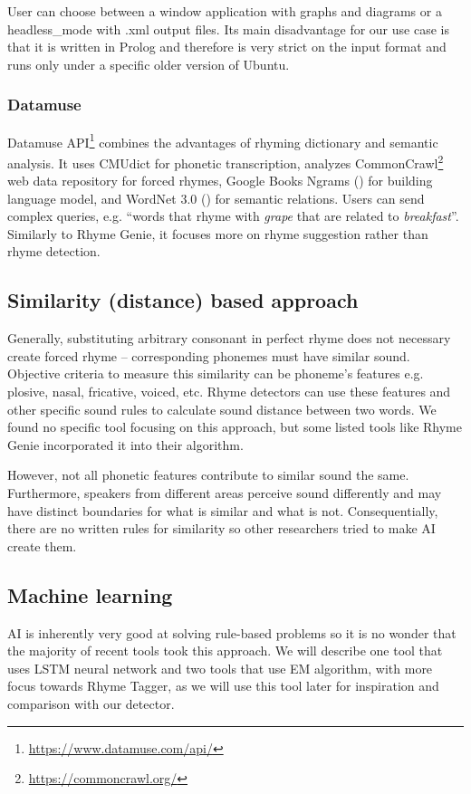User can choose between a window application with graphs and diagrams or a \gls{headless_mode} with .xml output files. Its main disadvantage for our use case is that it is written in Prolog and therefore is very strict on the input format and runs only under a specific older version of Ubuntu. 

\subsubsection*{Datamuse}
Datamuse API\footnote{\url{https://www.datamuse.com/api/}} combines the advantages of rhyming dictionary and semantic analysis. It uses CMUdict for phonetic transcription, analyzes CommonCrawl\footnote{\url{https://commoncrawl.org/}} web data repository for forced rhymes, Google Books Ngrams (\cite{weiss2015google}) for building language model, and WordNet 3.0 (\cite{pearson2005encyclopedia}) for semantic relations. Users can send complex queries, e.g. ``words that rhyme with \textit{grape} that are related to \textit{breakfast}''. Similarly to Rhyme Genie, it focuses more on rhyme suggestion rather than rhyme detection.


\subsection{Similarity (distance) based approach}
Generally, substituting arbitrary consonant in perfect rhyme does not necessary create forced rhyme -- corresponding phonemes must have similar sound. Objective criteria to measure this similarity can be phoneme's features e.g. plosive, nasal, fricative, voiced, etc. Rhyme detectors can use these features and other specific sound rules to calculate sound distance between two words. We found no specific tool focusing on this approach, but some listed tools like Rhyme Genie incorporated it into their algorithm. 

However, not all phonetic features contribute to similar sound the same. Furthermore, speakers from different areas perceive sound differently and may have distinct boundaries for what is similar and what is not. Consequentially, there are no written rules for similarity so other researchers tried to make AI create them.

\subsection{Machine learning}
AI is inherently very good at solving rule-based problems so it is no wonder that the majority of recent tools took this approach. We will describe one tool that uses \gls{LSTM} neural network and two tools that use EM algorithm, with more focus towards Rhyme Tagger, as we will use this tool later for inspiration and comparison with our detector.

